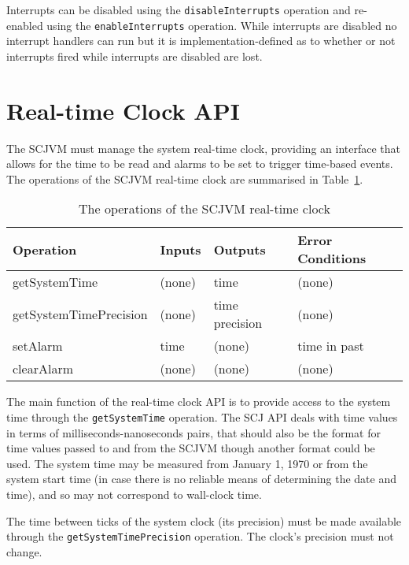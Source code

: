 \documentclass[a4paper,10pt]{report}
\begin{document}
Interrupts can be disabled using the \texttt{disable\-Interrupts} operation and
re-enabled using the \texttt{enable\-Interrupts} operation. While interrupts are
disabled no interrupt handlers can run but it is implementation-defined as to
whether or not interrupts fired while interrupts are disabled are lost.

\section{Real-time Clock API}
\label{realtime-clock-section}

The SCJVM must manage the system real-time clock, providing an interface that
allows for the time to be read and alarms to be set to trigger time-based
events. The operations of the SCJVM real-time clock are summarised in
Table~\ref{realtime-clock-table}.

\begin{table}[ht]
  \centering
  \footnotesize
  \begin{tabular}{|l|p{0.9cm}|p{1.8cm}|p{2.3cm}|}
    Operation & Inputs & Outputs & Error Conditions \\
    \hline
    getSystemTime &
      (none) &
      time &
      (none)
    \\getSystemTimePrecision &
      (none) &
      time precision &
      (none)
    \\setAlarm &
      time &
      (none) &
      time in past
    \\clearAlarm &
      (none) &
      (none) &
      (none)
  \end{tabular}
  \caption{The operations of the SCJVM real-time clock}
  \label{realtime-clock-table}
\end{table}

The main function of the real-time clock API is to provide access to the system
time through the \texttt{get\-System\-Time} operation. The SCJ API deals with
time values in terms of milliseconds-nanoseconds pairs, that should also be the
format for time values passed to and from the SCJVM though another format could
be used. The system time may be measured from January 1, 1970 or from the system
start time (in case there is no reliable means of determining the date
and time), and so may not correspond to wall-clock time.

The time between ticks of the system clock (its precision) must be made
available through the \texttt{get\-System\-Time\-Precision} operation. The
clock's precision must not change.
\end{document}
